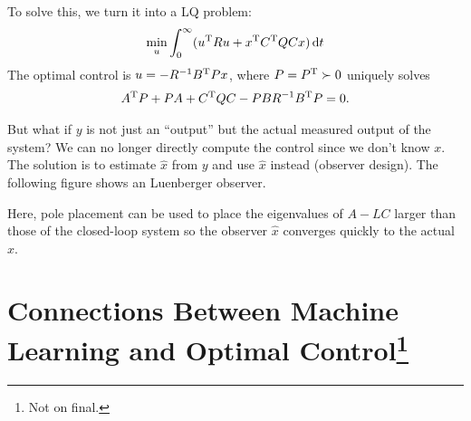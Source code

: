 To solve this, we turn it into a LQ problem:
\begin{gather}
  \min_u \int_0^\infty (u^\text{T} Ru + x^\text{T} C^\text{T} Q Cx)\mathop{}\!\mathrm{d} t
\end{gather}
The optimal control is $u=-R^{-1}B^\text{T} Px$, where $P=P^\text{T}\succ0$ uniquely solves
\begin{gather}
  A^\text{T} P + PA + C^\text{T} QC - PBR^{-1}B^\text{T} P = 0.
\end{gather}

But what if $y$ is not just an ``output'' but the actual measured output of the system? We can no longer directly compute the control since we don't know $x$. The solution is to estimate $\hat x$ from $y$ and use $\hat x$ instead (observer design). The following figure shows an Luenberger observer.

\begin{center}
\end{center}
Here, pole placement can be used to place the eigenvalues of $A-LC$ larger than those of the closed-loop system so the observer $\hat x$ converges quickly to the actual $x$.

\section[Connections Between Machine Learning and Optimal Control]{Connections Between Machine Learning and Optimal Control\footnote{Not on final.}}

